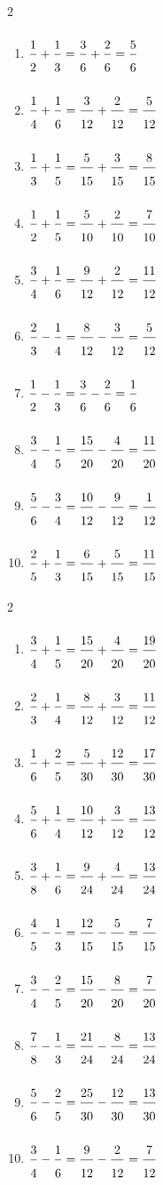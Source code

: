 \ExoC
\begin{multicols}{2}
\begin{enumerate}[leftmargin=*,align=parleft, label=\alph*), itemsep=6pt, topsep=2pt]
\item $\FA{1}{2}+\FA{1}{3}=\FA{3}{6}+\FA{2}{6}=\FA{5}{6}$
\item $\FA{1}{4}+\FA{1}{6}=\FA{3}{12}+\FA{2}{12}=\FA{5}{12}$
\item $\FA{1}{3}+\FA{1}{5}=\FA{5}{15}+\FA{3}{15}=\FA{8}{15}$
\item $\FA{1}{2}+\FA{1}{5}=\FA{5}{10}+\FA{2}{10}=\FA{7}{10}$
\item $\FA{3}{4}+\FA{1}{6}=\FA{9}{12}+\FA{2}{12}=\FA{11}{12}$
\item $\FA{2}{3}-\FA{1}{4}=\FA{8}{12}-\FA{3}{12}=\FA{5}{12}$
\item $\FA{1}{2}-\FA{1}{3}=\FA{3}{6}-\FA{2}{6}=\FA{1}{6}$
\item $\FA{3}{4}-\FA{1}{5}=\FA{15}{20}-\FA{4}{20}=\FA{11}{20}$
\item $\FA{5}{6}-\FA{3}{4}=\FA{10}{12}-\FA{9}{12}=\FA{1}{12}$
\item $\FA{2}{5}+\FA{1}{3}=\FA{6}{15}+\FA{5}{15}=\FA{11}{15}$
\end{enumerate}
\end{multicols}
 
\ExoC
\begin{multicols}{2}
\begin{enumerate}[leftmargin=*,align=parleft, label=\alph*), itemsep=6pt, topsep=2pt]
\item $\FA{3}{4}+\FA{1}{5}=\FA{15}{20}+\FA{4}{20}=\FA{19}{20}$
\item $\FA{2}{3}+\FA{1}{4}=\FA{8}{12}+\FA{3}{12}=\FA{11}{12}$
\item $\FA{1}{6}+\FA{2}{5}=\FA{5}{30}+\FA{12}{30}=\FA{17}{30}$
\item $\FA{5}{6}+\FA{1}{4}=\FA{10}{12}+\FA{3}{12}=\FA{13}{12}$
\item $\FA{3}{8}+\FA{1}{6}=\FA{9}{24}+\FA{4}{24}=\FA{13}{24}$
\item $\FA{4}{5}-\FA{1}{3}=\FA{12}{15}-\FA{5}{15}=\FA{7}{15}$
\item $\FA{3}{4}-\FA{2}{5}=\FA{15}{20}-\FA{8}{20}=\FA{7}{20}$
\item $\FA{7}{8}-\FA{1}{3}=\FA{21}{24}-\FA{8}{24}=\FA{13}{24}$
\item $\FA{5}{6}-\FA{2}{5}=\FA{25}{30}-\FA{12}{30}=\FA{13}{30}$
\item $\FA{3}{4}-\FA{1}{6}=\FA{9}{12}-\FA{2}{12}=\FA{7}{12}$
\end{enumerate}
\end{multicols}
 
